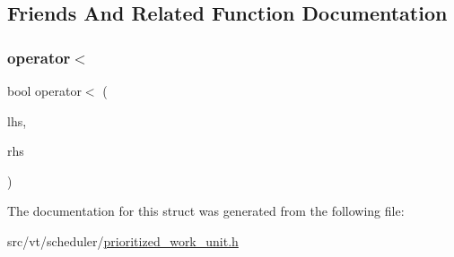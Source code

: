\subsection{Friends And Related Function Documentation}
\mbox{\label{structvt_1_1sched_1_1_priority_unit_acb3ebd4c059caed604579a0bbfb8b0e8}} 
\subsubsection{\texorpdfstring{operator$<$}{operator<}}
{\footnotesize\ttfamily bool operator$<$ (\begin{DoxyParamCaption}\item[{\hyperlink{structvt_1_1sched_1_1_priority_unit}{Priority\+Unit} const \&}]{lhs,  }\item[{\hyperlink{structvt_1_1sched_1_1_priority_unit}{Priority\+Unit} const \&}]{rhs }\end{DoxyParamCaption})\hspace{0.3cm}{\ttfamily [friend]}}



The documentation for this struct was generated from the following file\+:\begin{DoxyCompactItemize}
\item 
src/vt/scheduler/\hyperlink{prioritized__work__unit_8h}{prioritized\+\_\+work\+\_\+unit.\+h}\end{DoxyCompactItemize}

